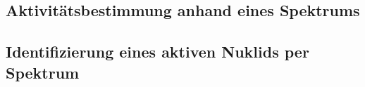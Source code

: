 \subsection{Aktivitätsbestimmung anhand eines Spektrums}
\label{sec:Aktivitätsbestimmung}

\subsection{Identifizierung eines aktiven Nuklids per Spektrum}
\label{sec:Nuklidbestimmung}




